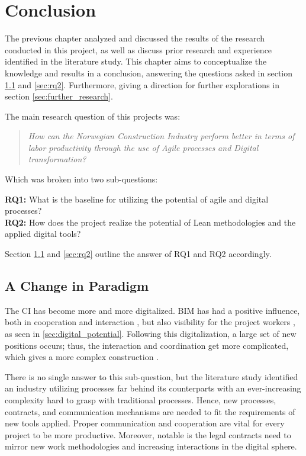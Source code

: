 
\chapter{Conclusion} \label{cha:conclusion}
The previous chapter analyzed and discussed the results of the research conducted in this project, as well as discuss prior research and experience identified in the literature study. This chapter aims to conceptualize the knowledge and results in a conclusion, answering the questions asked in section \ref{sec:rq1} and \ref{sec:rq2}. Furthermore, giving a direction for further explorations in section \ref{sec:further_research}.

\noindent The main research question of this projects was: 
\begin{quote}
    \textit{How can the Norwegian Construction Industry perform better in terms of labor productivity through the use of Agile processes and Digital transformation?} 
\end{quote}

\noindent Which was broken into two sub-questions:

{\noindent \bf RQ1:} What is the baseline for utilizing the potential of agile and digital processes? \\
{\bf RQ2:} How does the project realize the potential of Lean methodologies and the applied digital tools?

Section \ref{sec:rq1} and \ref{sec:rq2} outline the answer of RQ1 and RQ2 accordingly.

\section{A Change in Paradigm} \label{sec:rq1}
The CI has become more and more digitalized. BIM has had a positive influence, both in cooperation and interaction \cite{frank_gehry, gu2010understanding}, but also visibility for the project workers \cite{arayici2010building}, as seen in \ref{sec:digital_potential}. Following this digitalization, a large set of new positions occurs; thus, the interaction and coordination get more complicated, which gives a more complex construction \cite{arayici2010building, eadie2013bim, arayici2011technology}.

There is no single answer to this sub-question, but the literature study identified an industry utilizing processes far behind its counterparts with an ever-increasing complexity hard to grasp with traditional processes. Hence, new processes, contracts, and communication mechanisms are needed to fit the requirements of new tools applied. Proper communication and cooperation are vital for every project to be more productive. Moreover, notable is the legal contracts need to mirror new work methodologies and increasing interactions in the digital sphere.

